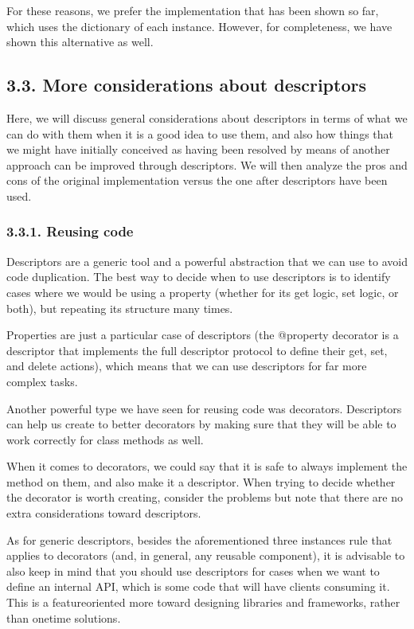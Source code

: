 \documentclass[a4paper,10pt,english]{sphinxmanual}
\begin{document}
For these reasons, we prefer the implementation that has been shown so far,
which uses the dictionary of each instance. However, for completeness, we have shown this
alternative as well.


\subsection{3.3. More considerations about descriptors}
\label{\detokenize{chapters/6_descriptors/index:more-considerations-about-descriptors}}
Here, we will discuss general considerations about descriptors in terms of what we can do
with them when it is a good idea to use them, and also how things that we might have
initially conceived as having been resolved by means of another approach can be improved
through descriptors. We will then analyze the pros and cons of the original implementation
versus the one after descriptors have been used.


\subsubsection{3.3.1. Reusing code}
\label{\detokenize{chapters/6_descriptors/index:reusing-code}}
Descriptors are a generic tool and a powerful abstraction that we can use to avoid code
duplication. The best way to decide when to use descriptors is to identify cases where we
would be using a property (whether for its get logic, set logic, or both), but repeating its
structure many times.

Properties are just a particular case of descriptors (the @property decorator is a descriptor
that implements the full descriptor protocol to define their get, set, and delete actions),
which means that we can use descriptors for far more complex tasks.

Another powerful type we have seen for reusing code was decorators. Descriptors can help us create to better
decorators by making sure that they will be able to work correctly for class methods as
well.

When it comes to decorators, we could say that it is safe to always implement the
 method on them, and also make it a descriptor. When trying to decide whether
the decorator is worth creating, consider the problems but note that there are no extra considerations
toward descriptors.

As for generic descriptors, besides the aforementioned three instances rule that applies to
decorators (and, in general, any reusable component), it is advisable to also keep in mind
that you should use descriptors for cases when we want to define an internal API, which is
some code that will have clients consuming it. This is a feature\sphinxhyphen{}oriented more toward
designing libraries and frameworks, rather than one\sphinxhyphen{}time solutions.
\end{document}
